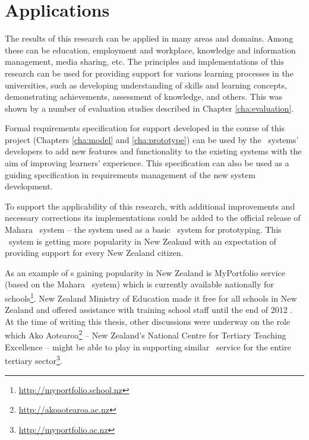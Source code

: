 \section{Applications}
The results of this research can be applied in many areas and domains. Among
these can be education, employment and workplace, knowledge and information
management, media sharing, etc. The principles and implementations of this
research can be used for providing support for various learning processes in the
universities, such as developing understanding of skills and learning concepts,
demonstrating achievements, assessment of knowledge, and others. This was shown
by a number of evaluation studies described in Chapter \ref{cha:evaluation}.

Formal requirements specification for \LLLs support developed in the course of
this project (Chapters \ref{cha:model} and \ref{cha:prototype}) can be used by
the \ep~systems' developers to add new features and functionality to the
existing systems with the aim of improving learners' experience. This
specification can also be used as a guiding specification in requirements
management of the new system development.

To support the applicability of this research, with additional improvements
and necessary corrections its implementations could be added to the official
release of Mahara \ep~system -- the system used as a basic \ep~system for
prototyping. This \ep~system is getting more popularity in New Zealand with an
expectation of providing \LLLs support for every New Zealand citizen. 

As an example of \ep s gaining popularity in New Zealand is MyPortfolio service
(based on the Mahara \ep~system) which is currently available nationally for
schools\footnote{\url{http://myportfolio.school.nz}}. New Zealand Ministry of
Education made it free for all schools in New Zealand and offered assistance
with training school staff until the end of 2012
\citep{NewZealandMinistryofEducation2012}. At the time of writing this thesis,
other discussions were underway on the role which Ako
Aotearoa\footnote{\url{http://akoaotearoa.ac.nz}} -- New Zealand's National
Centre for Tertiary Teaching Excellence -- might be able to play in supporting
similar \ep~service for the entire tertiary
sector\footnote{\url{http://myportfolio.ac.nz}}.
